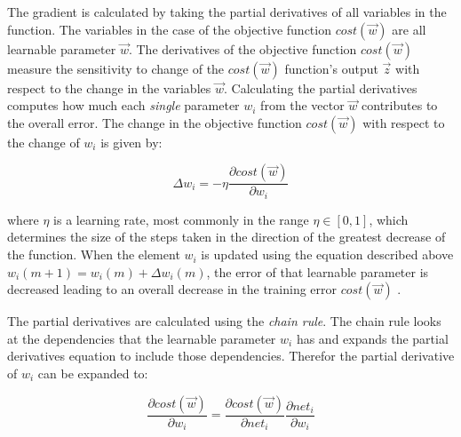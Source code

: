 The gradient is calculated by taking the partial derivatives of all variables in the function. The variables in the case of the objective function $cost(\vec{w})$ are all learnable parameter $\vec{w}$. The derivatives of the objective function $cost(\vec{w})$ measure the sensitivity to change of the $cost(\vec{w})$ function's output $\vec{z}$ with respect to the change in the variables $\vec{w}$. Calculating the partial derivatives computes how much each \textit{single} parameter $w_i$ from the vector $\vec{w}$ contributes to the overall error. The change in the objective function $cost(\vec{w})$ with respect to the change of $w_i$ is given by:


\begin{equation*}
\Delta w_i = -\eta \frac{\partial cost(\vec{w})}{\partial w_{i}}
\end{equation*}

where $\eta$ is a learning rate, most commonly in the range $\eta \in [0,1]$, which determines the size of the steps taken in the direction of the greatest decrease of the function. When the element $w_i$ is updated using the equation described above ${w_i(m+1)=w_i(m)+\Delta w_i(m)}$, the error of that learnable parameter is decreased leading to an overall decrease in the training error $cost(\vec{w})$ .

The partial derivatives are calculated using the \textit{chain rule}. The chain rule looks at the dependencies that the learnable parameter $w_i$ has and expands the partial derivatives equation to include those dependencies. Therefor the partial derivative of $w_i$ can be expanded to:

\begin{equation*}
\frac{\partial cost(\vec{w})}{\partial w_{i}} = \frac{\partial cost(\vec{w})}{\partial net_i} \frac{\partial net_i}{\partial w_{i}} 
\end{equation*}


